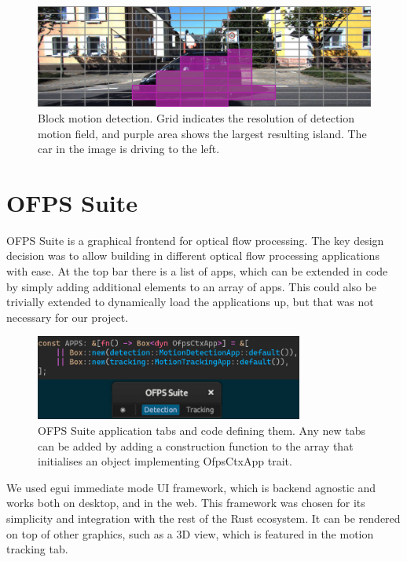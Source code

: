 \documentclass[11pt,english]{report}
\begin{document}
\begin{figure}[!ht]
	\centering
	\includegraphics[width=350pt]{docs/report/detection.jpg}
	\caption{\centering Block motion detection. Grid indicates the resolution of detection motion field, and purple area shows the largest resulting island. The car in the image is driving to the left.}
\end{figure}

\section{OFPS Suite}

OFPS Suite is a graphical frontend for optical flow processing. The key design decision was to allow building in different optical flow processing applications with ease. At the top bar there is a list of apps, which can be extended in code by simply adding additional elements to an array of apps. This could also be trivially extended to dynamically load the applications up, but that was not necessary for our project.

\begin{figure}[!ht]
	\centering
	\includegraphics[width=250pt]{docs/report/ofps-suite-apps.jpg}
	\caption{\centering OFPS Suite application tabs and code defining them. Any new tabs can be added by adding a construction function to the array that initialises an object implementing OfpsCtxApp trait.}
\end{figure}

We used egui\cite{egui} immediate mode UI framework, which is backend agnostic and works both on desktop, and in the web. This framework was chosen for its simplicity and integration with the rest of the Rust ecosystem. It can be rendered on top of other graphics, such as a 3D view, which is featured in the motion tracking tab.
\end{document}
